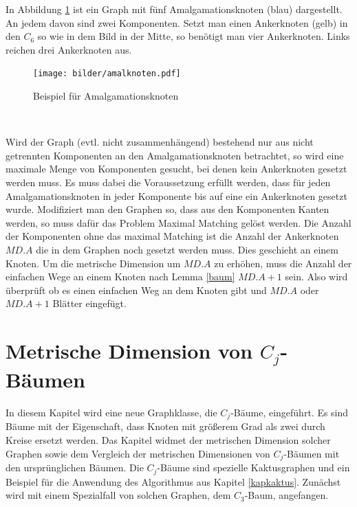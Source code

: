 \vspace{-3mm}
\begin{bsp}In Abbildung \ref{amalbild} ist ein Graph mit fünf Amalgamationsknoten (blau) dargestellt. An jedem davon sind zwei Komponenten. Setzt man einen Ankerknoten (gelb) in den $C_6$ so wie in dem Bild in der Mitte, so benötigt man vier Ankerknoten. Links reichen drei Ankerknoten aus.\newline
\vspace{-3mm}
\begin{figure}[h!]
		\centering 		 
   \texttt{[image: bilder/amalknoten.pdf]}
	\caption{Beispiel für Amalgamationsknoten}
  	 \label{amalbild}
  	 \end{figure}
  	 \vspace{-7mm}
  	 ~\linebreak
  	 \end{bsp}
Wird der Graph (evtl. nicht zusammenhängend) bestehend nur aus nicht getrennten Komponenten an den Amalgamationsknoten betrachtet, so wird eine maximale Menge von Komponenten gesucht, bei denen kein Ankerknoten gesetzt werden muss. Es muss dabei die Voraussetzung erfüllt werden, dass für jeden Amalgamationsknoten in jeder Komponente bis auf eine ein Ankerknoten gesetzt wurde. Modifiziert man den Graphen so, dass aus den Komponenten Kanten werden, so muss dafür das Problem Maximal Matching gelöst werden.\newline
Die Anzahl der Komponenten ohne das maximal Matching ist die Anzahl der Ankerknoten $MD.A$ die in dem Graphen noch gesetzt werden muss. Dies geschieht an einem Knoten. Um die metrische Dimension um $MD.A$ zu erhöhen, muss die Anzahl der einfachen Wege an einem Knoten nach Lemma \ref{baum} $MD.A+1$ sein. Also wird überprüft ob es einen einfachen Weg an dem Knoten gibt und $MD.A$ oder $MD.A+1$ Blätter eingefügt.
\newpage
\chapter{Metrische Dimension von $C_j$-Bäumen}
\label{kapcjbaume}
\vspace{-2mm}
In diesem Kapitel wird eine neue Graphklasse, die $C_j$-Bäume, eingeführt. Es sind Bäume mit der Eigenschaft, dass Knoten mit größerem Grad als zwei durch Kreise ersetzt werden. Das Kapitel widmet der metrischen Dimension solcher Graphen sowie dem Vergleich der metrischen Dimensionen von $C_j$-Bäumen mit den ursprünglichen Bäumen. Die $C_j$-Bäume sind spezielle Kaktusgraphen und ein Beispiel für die Anwendung des Algorithmus aus Kapitel \ref{kapkaktus}. Zunächst wird mit einem Spezialfall von solchen Graphen, dem $C_3$-Baum, angefangen.
\vspace{-3mm}
